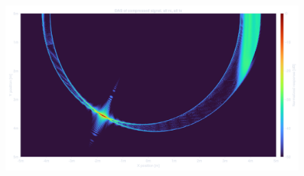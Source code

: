 \documentclass[compress,aspectratio=169]{beamer}
\begin{document}
\begin{frame} %
    \begin{figure}
        \includegraphics[width=0.97\columnwidth]{"../4.png"}
    \end{figure}
\end{frame} %
\end{document}

